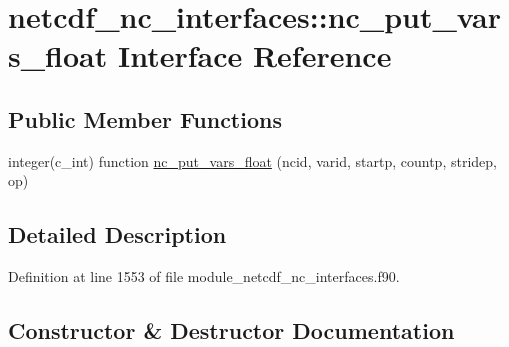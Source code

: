 \hypertarget{interfacenetcdf__nc__interfaces_1_1nc__put__vars__float}{}\section{netcdf\+\_\+nc\+\_\+interfaces\+:\+:nc\+\_\+put\+\_\+vars\+\_\+float Interface Reference}
\label{interfacenetcdf__nc__interfaces_1_1nc__put__vars__float}
\subsection*{Public Member Functions}
\begin{DoxyCompactItemize}
\item 
integer(c\+\_\+int) function \hyperlink{interfacenetcdf__nc__interfaces_1_1nc__put__vars__float_a3395ca77cc498da77841d369e82fa919}{nc\+\_\+put\+\_\+vars\+\_\+float} (ncid, varid, startp, countp, stridep, op)
\end{DoxyCompactItemize}


\subsection{Detailed Description}


Definition at line 1553 of file module\+\_\+netcdf\+\_\+nc\+\_\+interfaces.\+f90.



\subsection{Constructor \& Destructor Documentation}
\mbox{\label{interfacenetcdf__nc__interfaces_1_1nc__put__vars__float_a3395ca77cc498da77841d369e82fa919}} 
